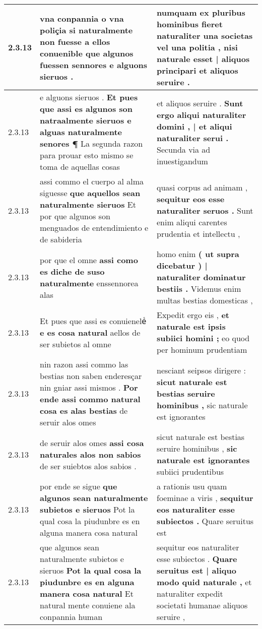 \begin{tabular}{|p{1cm}|p{6.5cm}|p{6.5cm}|}
2.3.13 & vna conpannia o vna poliçia \textbf{ si naturalmente non fuesse a ellos conuenible que algunos fuessen sennores } e alguons sieruos . & numquam ex pluribus hominibus fieret naturaliter una societas vel una politia , \textbf{ nisi naturale esset | aliquos principari } et aliquos seruire . \\\hline
2.3.13 & e alguons sieruos . \textbf{ Et pues que assi es algunos son natraalmente sieruos e alguas naturalmente senores ¶ } La segunda razon para prouar esto mismo se toma de aquellas cosas & et aliquos seruire . \textbf{ Sunt ergo aliqui naturaliter domini , | et aliqui naturaliter serui . } Secunda via ad inuestigandum \\\hline
2.3.13 & assi commo el cuerpo al alma siguesse \textbf{ que aquellos sean naturalmente sieruos } Et por que algunos son menguados de entendimiento e de sabideria & quasi corpus ad animam , \textbf{ sequitur eos esse naturaliter seruos . } Sunt enim aliqui carentes prudentia et intellectu , \\\hline
2.3.13 & por que el omne \textbf{ assi como es diche de suso naturalmente } enssennorea alas & homo enim \textbf{ ( ut supra dicebatur ) | naturaliter dominatur bestiis . } Videmus enim multas bestias domesticas , \\\hline
2.3.13 & Et pues que assi es conuieneleᷤ \textbf{ e es cosa natural } aellos de ser subietos al omne & Expedit ergo eis , \textbf{ et naturale est ipsis subiici homini ; } eo quod per hominum prudentiam \\\hline
2.3.13 & nin razon assi commo las bestias non saben enderesçar nin gniar assi mismos . \textbf{ Por ende assi commo natural cosa es alas bestias } de seruir alos omes & nesciant seipsos dirigere : \textbf{ sicut naturale est bestias seruire hominibus , } sic naturale est ignorantes \\\hline
2.3.13 & de seruir alos omes \textbf{ assi cosa naturales alos non sabios } de ser suiebtos alos sabios . & sicut naturale est bestias seruire hominibus , \textbf{ sic naturale est ignorantes } subiici prudentibus \\\hline
2.3.13 & por ende se sigue \textbf{ que algunos sean naturalmente subietos e sieruos } Pot la qual cosa la piudunbre es en alguna manera cosa natural & a rationis usu quam foeminae a viris , \textbf{ sequitur eos naturaliter esse subiectos . } Quare seruitus est \\\hline
2.3.13 & que algunos sean naturalmente subietos e sieruos \textbf{ Pot la qual cosa la piudunbre es en alguna manera cosa natural } Et natural mente conuiene ala conpannia human & sequitur eos naturaliter esse subiectos . \textbf{ Quare seruitus est | aliquo modo quid naturale , } et naturaliter expedit societati humanae aliquos seruire , \\\hline

\end{tabular}
